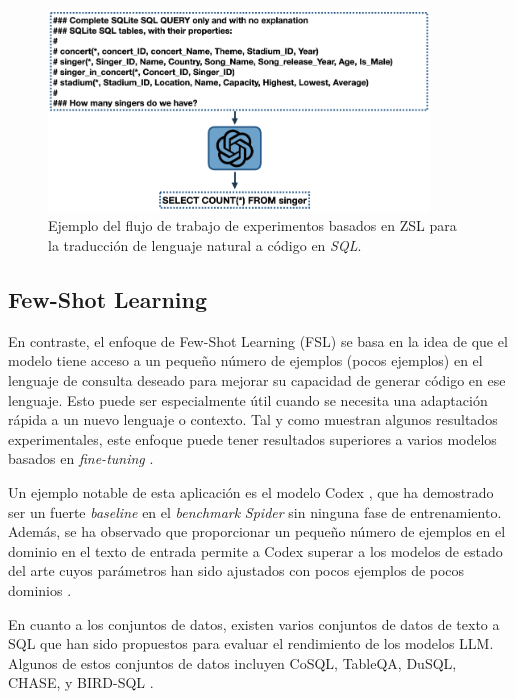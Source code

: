 \begin{figure}[H]\label{zslpromtpsql}
	\centering
	\includegraphics[width = 0.9\textwidth]{./Graphics/zslpromptsql}
	\caption{Ejemplo del flujo de trabajo de experimentos basados en ZSL para la traducción de lenguaje natural a código en \textit{SQL}.}
\end{figure} 

\subsection{Few-Shot Learning} \label{llm_approach_fsl}
	En contraste, el enfoque de Few-Shot Learning (FSL) \cite{fewshotlearning} se basa en la idea de que el modelo tiene acceso a un pequeño número de ejemplos (pocos ejemplos) en el lenguaje de consulta deseado para mejorar su capacidad de generar código en ese lenguaje. Esto puede ser especialmente útil cuando se necesita una adaptación rápida a un nuevo lenguaje o contexto. Tal y como muestran algunos resultados experimentales, este enfoque puede tener resultados superiores a varios modelos basados en \textit{fine-tuning} \cite{ftvsllmtext2sql}.

Un ejemplo notable de esta aplicación es el modelo Codex \cite{codex}, que ha demostrado ser un fuerte \textit{baseline} en el \textit{benchmark} \textit{Spider} \cite{spiderdataset} sin ninguna fase de entrenamiento. Además, se ha observado que proporcionar un pequeño número de ejemplos en el dominio en el texto de entrada permite a Codex superar a los modelos de estado del arte cuyos parámetros han sido ajustados con pocos ejemplos de pocos dominios \cite{codex}.

En cuanto a los conjuntos de datos, existen varios conjuntos de datos de texto a SQL que han sido propuestos para evaluar el rendimiento de los modelos LLM. Algunos de estos conjuntos de datos incluyen CoSQL, TableQA, DuSQL, CHASE, y BIRD-SQL \cite{CoSQL} \cite{TableQA} \cite{DuSQL} \cite{CHASE} \cite{BIRD-SQL}.

